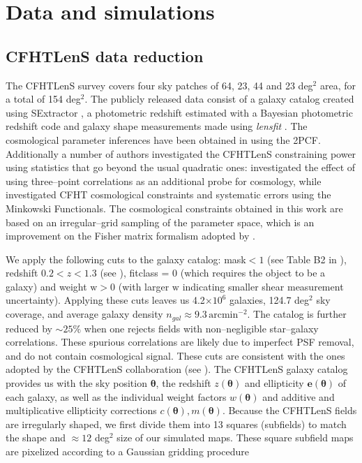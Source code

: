 \documentclass[reprint,aps,prd,superscriptaddress,showkeys,showpacs]{revtex4-1}
\begin{document}


\section{Data and simulations}

\subsection{CFHTLenS data reduction}
\label{cfhtdatareduction}
%
The CFHTLenS survey covers four sky patches of 64, 23, 44 and 23 deg$^2$ area, for a total of 154 deg$^2$. The publicly released data consist of a galaxy catalog created using SExtractor \citep{SExtractor}, a photometric redshift estimated with a Bayesian photometric redshift code \citep{PhotoCode} and galaxy shape measurements made using \textit{lensfit} \citep{cfht1,cfht2}. The cosmological parameter inferences have been obtained in \citep{CFHTKilbinger} using the 2PCF. Additionally a number of authors investigated the CFHTLenS constraining power using statistics that go beyond the usual quadratic ones: \citep{CFHTFu} investigated the effect of using three--point correlations as an additional probe for cosmology, while \citep{CFHTMasato} investigated CFHT cosmological constraints and systematic errors using the Minkowski Functionals. The cosmological constraints obtained in this work are based on an irregular--grid sampling of the parameter space, which is an improvement on the Fisher matrix formalism adopted by \citep{CFHTMasato}. 

We apply the following cuts to the galaxy catalog: mask$<1$ (see Table B2 in \citep{SExtractor}), redshift $0.2 < z < 1.3$ (see \citep{cfht1}), fitclass = 0 (which requires the object to be a galaxy) and weight $\mathrm{w}>0$ (with larger $\mathrm{w}$ indicating smaller shear measurement uncertainty). Applying these cuts leaves us 4.2$\times10^6$ galaxies, 124.7 deg$^2$ sky coverage, and average galaxy density $n_{gal} \approx 9.3\,\mathrm{arcmin}^{-2}$. The catalog is further reduced by $\sim25\%$ when one rejects fields with non--negligible star--galaxy correlations. These spurious correlations are likely due to imperfect PSF removal, and do not contain cosmological signal. These cuts are consistent with the ones adopted by the CFHTLenS collaboration (see \citep{CFHTFu}). The CFHTLenS galaxy catalog provides us with the sky position $\pmb{\theta}$, the redshift $z(\pmb{\theta})$ and ellipticity $\mathbf{e}(\pmb{\theta})$ of each galaxy, as well as the individual weight factors $w(\pmb{\theta})$ and additive and multiplicative ellipticity corrections $c(\pmb{\theta}), m(\pmb{\theta})$. Because the CFHTLenS fields are irregularly shaped, we first divide them into 13 squares (subfields) to match the shape and $\approx12$ deg$^2$ size of our simulated maps. These square subfield maps are pixelized according to a Gaussian gridding procedure
\end{document}
